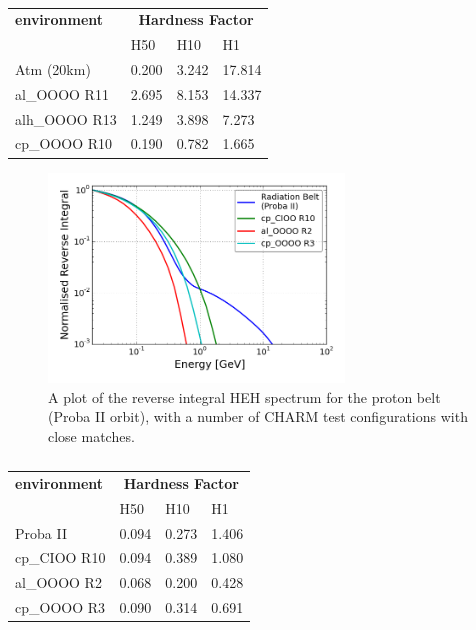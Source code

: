 \begin{table}[htbp]
\centering
\begin{tabular}{l|l|l|l}
\textbf{environment} & \multicolumn{3}{c}{\textbf{Hardness Factor}} \\ \cline{2-4}
				& H50   & H10   & H1 \\
\hline
\hline
\rowcolor{gray!30} Atm (20km) & 0.200 & 3.242 & 17.814 \\
al\_OOOO R11	& 2.695 & 8.153 & 14.337 \\
alh\_OOOO R13	& 1.249 & 3.898 & 7.273 \\
cp\_OOOO R10 	& 0.190 & 0.782 & 1.665 \\
\end{tabular}%
\caption{}
\label{tab:hardness_factor_atm_nyc}%
\end{table}%

\clearpage

\begin{figure}[ht!]
	\centering
	\includegraphics[width=0.7\textwidth]{./images/hardness/space_charm_comparison}
	\caption{A plot of the reverse integral HEH spectrum for the proton belt (Proba II orbit), with a number of CHARM test configurations with close matches.}
	\label{fig:space_charm_comparison}
\end{figure}

\begin{table}[htbp]
\centering
\begin{tabular}{l|l|l|l}
\textbf{environment} & \multicolumn{3}{c}{\textbf{Hardness Factor}} \\ \cline{2-4}
				& H50   & H10   & H1 \\
\hline
\hline
\rowcolor{gray!30} Proba II & 0.094 & 0.273 & 1.406 \\
cp\_CIOO R10	& 0.094 & 0.389 & 1.080 \\
al\_OOOO R2		& 0.068 & 0.200 & 0.428 \\
cp\_OOOO R3 	& 0.090 & 0.314 & 0.691 \\
\end{tabular}%
\caption{}
\label{tab:hardness_factor_proba}%
\end{table}%


